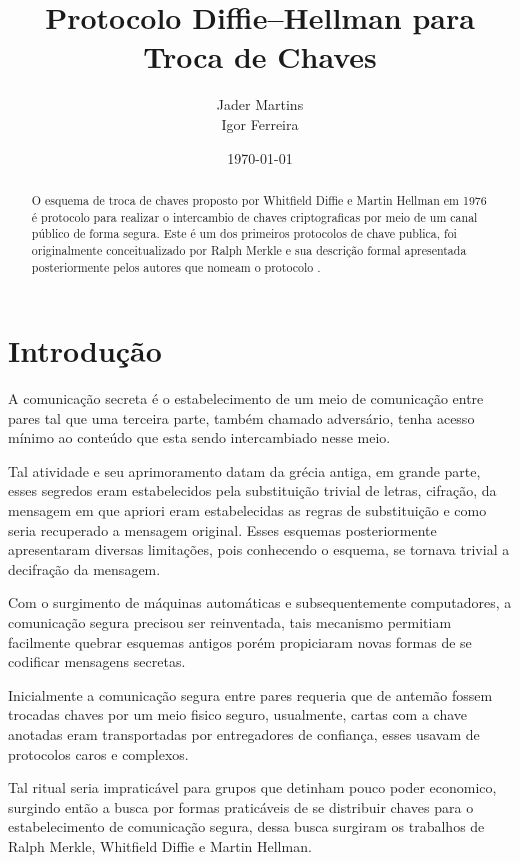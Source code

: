 \documentclass{article}
\title{Protocolo Diffie–Hellman para Troca de Chaves}
\author{Jader Martins\\
        Igor Ferreira}
\date{\today}
\begin{document}
\maketitle

\begin{abstract}
    O esquema de troca de chaves proposto por Whitfield Diffie e
    Martin Hellman em 1976 é protocolo para realizar
    o intercambio de chaves criptograficas por meio de um canal público
    de forma segura\cite{Diffie}. Este é um dos primeiros protocolos de
    chave publica, foi originalmente conceitualizado por Ralph Merkle
    e sua descrição formal apresentada posteriormente pelos autores que
    nomeam o protocolo \cite{Merkle}.
\end{abstract}

\section{Introdução}%
\label{sec:introducao}
A comunicação secreta é o estabelecimento de um meio de comunicação entre pares
tal que uma terceira parte, também chamado adversário, tenha acesso mínimo ao
conteúdo que esta sendo intercambiado nesse meio.

Tal atividade e seu aprimoramento datam da grécia
antiga\cite{katz2014introduction}, em grande parte, esses segredos eram
estabelecidos pela substituição trivial de letras, cifração, da mensagem em que
apriori eram estabelecidas as regras de substituição e como seria recuperado a
mensagem original. Esses esquemas posteriormente apresentaram diversas
limitações, pois conhecendo o esquema, se tornava trivial a decifração da
mensagem.

Com o surgimento de máquinas automáticas e subsequentemente computadores, a
comunicação segura precisou ser reinventada\cite{singh1999code}, tais mecanismo
permitiam facilmente quebrar esquemas antigos porém propiciaram novas formas de
se codificar mensagens secretas.


Inicialmente a comunicação segura entre pares requeria que de antemão fossem
trocadas chaves por um meio fisico seguro, usualmente, cartas com a chave
anotadas eram transportadas por entregadores de confiança, esses usavam de
protocolos caros e complexos\cite{matsumoto1987key}.

Tal ritual seria impraticável para grupos que detinham pouco poder economico,
surgindo então a busca por formas praticáveis de se distribuir chaves para o
estabelecimento de comunicação segura, dessa busca surgiram os trabalhos de
Ralph Merkle, Whitfield Diffie e Martin Hellman.
\end{document}
